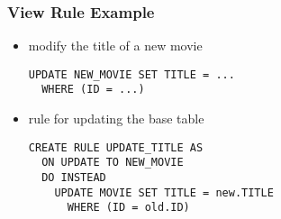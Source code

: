 \documentclass[dvipsnames]{beamer}
\theoremstyle{plain}
\begin{document}
\begin{frame}[fragile]
  \frametitle{View Rule Example}

  \begin{itemize}
    \item modify the title of a new movie
    \begin{lstlisting}
UPDATE NEW_MOVIE SET TITLE = ...
  WHERE (ID = ...)
    \end{lstlisting}

    \pause
    \medskip
    \item rule for updating the base table
    \begin{lstlisting}
CREATE RULE UPDATE_TITLE AS
  ON UPDATE TO NEW_MOVIE
  DO INSTEAD
    UPDATE MOVIE SET TITLE = new.TITLE
      WHERE (ID = old.ID)
    \end{lstlisting}
  \end{itemize}
\end{frame}
%
%
%
%
%
%
%
\end{document}
